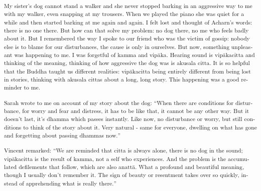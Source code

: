 \textsuperscript{\textenglish[variant=american]{My
sister}'\textenglish[variant=american]{s dog cannot stand a walker and
she never stopped barking in an aggressive way to me}\textdutch{ with my
walker}\textenglish[variant=american]{, even snapping at my trousers.
When we played the piano she was quiet for a while and then started
barking at me again and again. I felt lost and thought of
Acharn}'\textenglish[variant=american]{s words: there is no one there.
But how can that solve my problem: no dog there, no me who feels badly
about it. But I remembered the way I spoke to our friend who was the
victim of gossip: nobody else is to blame for our disturbances, the
cause is only in ourselves. But now, something unpleasant was happening
to me. I was forgetful of kamma and
vip}\textdutch{ā}\textenglish[variant=american]{ka. Hearing sound is
vip}\textdutch{ā}\textenglish[variant=american]{kacitta and thinking of
the meaning, thinking of how aggressive the dog was is akusala citta. It
is so helpful that the Buddha taught us different realities:
vip}\textdutch{ā}\textenglish[variant=american]{kacitta being entirely
different from being lost in stories, thinking with akusala cittas about
a long, long story. This happening was a good reminder to me. }}

\textsuperscript{\textdutch{Sarah wrote to me on account of my story
about the dog: ``}\textenglish[variant=american]{When there are
conditions for disturbance, for worry and fear and distress, it has to
be like that, it cannot be any other way. But it doesn't last, it's
dhamma which passes instantly. Like now, no disturbance or worry, but
still conditions to think }\textdutch{of}\textenglish[variant=american]{
the story about it. Very natural - same for}\textdutch{
}\textenglish[variant=american]{everyone, dwelling on what has gone and
forgetting about passing dhammas now.}\textdutch{'' }}

\textsuperscript{V\textdutch{incent remarked:}
\textdutch{``}\textenglish[variant=american]{We are reminded that citta
is always alone, there is no dog in the sound;
vip}\textdutch{ā}\textitalian{kacitta }\textdutch{is the
}\textenglish[variant=american]{result of kamma, not a self who
experiences. And the problem is the accumulated defilements that follow,
which are also anatt}\textdutch{ā}\textenglish[variant=american]{. What
a profound and beautiful meaning, though I usually don't remember it.
The sign of beauty or resentment
take}\textdutch{s}\textenglish[variant=american]{ over so quickly,
instead of apprehending what is really there.}\textdutch{''}~}

